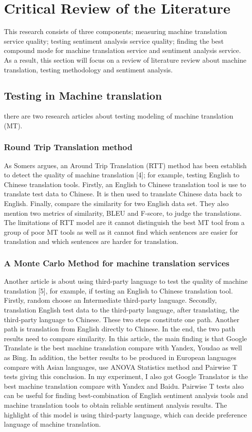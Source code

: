 \documentclass[conference,compsoc]{IEEEtran}
\begin{document}
\section{Critical Review of the Literature}
This research consists of three components; measuring machine translation service quality; testing sentiment analysis service quality; finding the best compound mode for machine translation service and sentiment analysis service. As a result, this section will focus on a review of literature review about machine translation, testing methodology and sentiment analysis.
\subsection{Testing in Machine translation}
there are two research articles about testing modeling of machine translation
(MT).

\subsubsection{Round Trip Translation method}
As Somers argues, an Around Trip Translation (RTT) method has been establish to detect the quality of machine translation [4]; for example, testing English to Chinese translation tools. Firstly, an English to Chinese translation tool is use to translate test data to Chinese. It is then used to translate Chinese data back to English. Finally, compare the similarity for two English data set. They also mention two metrics of similarity, BLEU and F-score, to judge the translations. The limitations of RTT model are it cannot distinguish the best MT tool from a group of poor MT tools as well as it cannot find which sentences are easier for translation and which sentences are harder for translation.

\subsubsection{A Monte Carlo Method for machine translation services}
Another article is about using third-party language to test the quality of
machine translation [5], for example, if testing an English to Chinese
translation tool. Firstly, random choose an Intermediate third-party language.
Secondly, translation English test data to the third-party language, after
translating, the third-party language to Chinese. These two steps constitute one
path. Another path is translation from English directly to Chinese. In the end,
the two path results need to compare similarity. In this article, the main
finding is that Google Translate is the best machine translation compare with
Yandex, Youdao as well as Bing. In addition, the better results to be produced
in European languages compare with Asian languages, use ANOVA Statistics method
and Pairwise T tests giving this conclusion. In my experiment, I also got Google
Translator is the best machine translation compare with Yandex and Baidu.
Pairwise T tests also can be useful for finding best-combination of English
sentiment analysis tools and machine translation tools to obtain reliable
sentiment analysis results. The highlight of this model is using third-party
language, which can decide preference language of machine translation.
\end{document}

